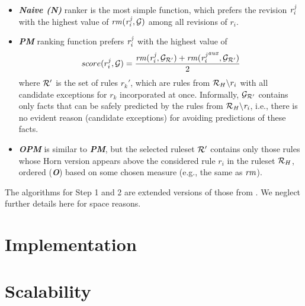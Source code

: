 \begin{itemize}
\item {\textbf{\em Naive (N)}} ranker is the most simple function, which prefers the revision $\mathit{r^j_i}$ with the highest value of $\mathit{rm(r^j_{i},\mathcal{G})}$ among all revisions of $r_i$.
\smallskip

\item {\textbf{\em PM}} ranking function prefers $\mathit{r^j_i}$ with the highest value of
\begin{equation}
\label{pm}
score(r^j_i,\mathcal{G})=\dfrac{\mathit{rm(r^j_i,\mathcal{G}_{\mathcal{R}'})+rm({r^j_i}^{aux},\mathcal{G}_{\mathcal{R}'})}}{2}
\end{equation}
 where $\mathcal{R}'$ is the set of rules $r_k'$, which are rules from $\mathcal{R}_H\backslash r_i$ with all candidate exceptions for $r_k$ incorporated at once. Informally, $\mathcal{G}_{\mathcal{R}'}$ contains only facts that can be safely predicted by the rules from $\mathit{\mathcal{R}_H\backslash r_i}$, i.e., there is no evident reason (candidate exceptions) for avoiding predictions of these facts.
 \smallskip
 
\item {\textbf{\em OPM}} is similar to \textbf{{\em PM}}, but the selected ruleset $\mathcal{R}'$ contains only those rules whose Horn version appears above the considered rule $r_i$ in the ruleset $\mathcal{R}_H$, ordered (\textbf{\em O}) based on some chosen measure (e.g., the same as $\mathit{rm}$). 
\end{itemize}

The algorithms for Step 1 and 2 are extended versions of those from \cite{iswc2016}. We neglect further details here for space reasons.

\section{Implementation}

\section{Scalability}